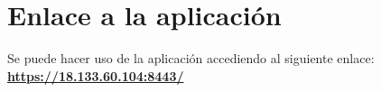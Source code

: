 \section{Enlace a la aplicación}
Se puede hacer uso de la aplicación accediendo al siguiente enlace: \textbf{\href{https://18.133.60.104:8443/}{https://18.133.60.104:8443/}}


